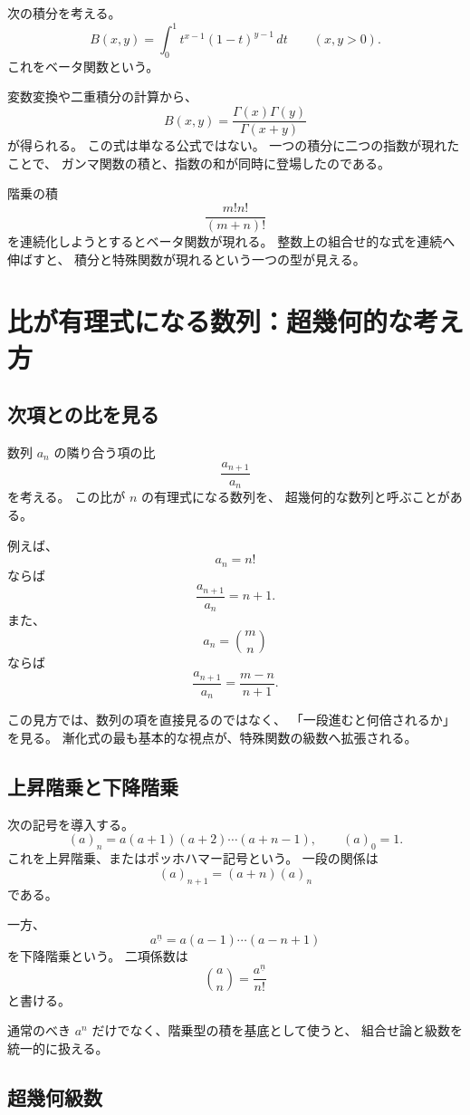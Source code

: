 次の積分を考える。
\[
  B(x,y)=\int_0^1 t^{x-1}(1-t)^{y-1}\,dt
  \qquad (x,y>0).
\]
これをベータ関数という。

変数変換や二重積分の計算から、
\[
  B(x,y)=\frac{\Gamma(x)\Gamma(y)}{\Gamma(x+y)}
\]
が得られる。
この式は単なる公式ではない。
一つの積分に二つの指数が現れたことで、
ガンマ関数の積と、指数の和が同時に登場したのである。

階乗の積
\[
  \frac{m!n!}{(m+n)!}
\]
を連続化しようとするとベータ関数が現れる。
整数上の組合せ的な式を連続へ伸ばすと、
積分と特殊関数が現れるという一つの型が見える。

\section{比が有理式になる数列：超幾何的な考え方}

\subsection{次項との比を見る}

数列 $a_n$ の隣り合う項の比
\[
  \frac{a_{n+1}}{a_n}
\]
を考える。
この比が $n$ の有理式になる数列を、
超幾何的な数列と呼ぶことがある。

例えば、
\[
  a_n=n!
\]
ならば
\[
  \frac{a_{n+1}}{a_n}=n+1.
\]
また、
\[
  a_n=\binom{m}{n}
\]
ならば
\[
  \frac{a_{n+1}}{a_n}
  =\frac{m-n}{n+1}.
\]

この見方では、数列の項を直接見るのではなく、
「一段進むと何倍されるか」を見る。
漸化式の最も基本的な視点が、特殊関数の級数へ拡張される。

\subsection{上昇階乗と下降階乗}

次の記号を導入する。
\[
  (a)_n=a(a+1)(a+2)\cdots(a+n-1),
  \qquad (a)_0=1.
\]
これを上昇階乗、またはポッホハマー記号という。
一段の関係は
\[
  (a)_{n+1}=(a+n)(a)_n
\]
である。

一方、
\[
  a^{\underline n}
  =a(a-1)\cdots(a-n+1)
\]
を下降階乗という。
二項係数は
\[
  \binom{a}{n}
  =\frac{a^{\underline n}}{n!}
\]
と書ける。

通常のべき $a^n$ だけでなく、階乗型の積を基底として使うと、
組合せ論と級数を統一的に扱える。

\subsection{超幾何級数}

